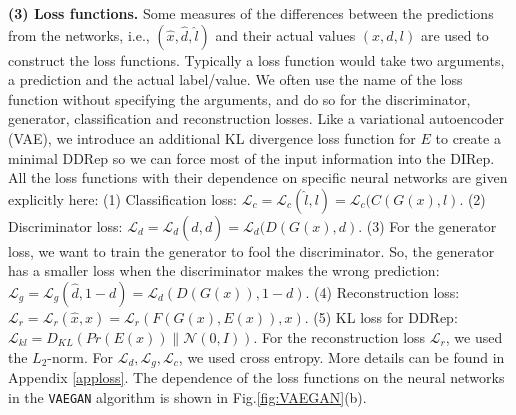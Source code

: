 \documentclass{article}
\newcommand\todo[1]{\textcolor{red}{#1}}
\newcommand{\remove}[1]{}
\begin{document}

\remove{\todo{I changed the following equations a bit. Please check for correctness, in particular the generator loss. I also added a bit of text and changed the order. BTW removing this todo shortens the length more than one might think}}
{\bf (3) Loss functions.} Some measures of the differences between the predictions from the networks, i.e., $(\hat{x},\hat{d},\hat{l})$ and their actual values $(x,d,l)$ are used to construct the loss functions. Typically a loss function would take two arguments, a prediction and the actual label/value. We often use the name of the loss function without specifying the arguments, and do so for the discriminator, generator, classification and reconstruction losses. Like a variational autoencoder (VAE), we introduce an additional KL divergence loss function for $E$ to create a minimal DDRep so we can force most of the input information into the DIRep. All the loss functions with their dependence on specific neural networks are given explicitly here: (1) Classification loss: $\mathcal{L}_c=\mathcal{L}_c(\hat{l},l)=\mathcal{L}_c(C(G(x),l)$. (2) Discriminator loss: $\mathcal{L}_d= \mathcal{L}_d (\hat{d},d)=\mathcal{L}_d(D(G(x),d)$. (3) For the generator loss, we want to train the generator to fool the discriminator. So, the generator has a smaller loss when the discriminator makes the wrong prediction: $\mathcal{L}_g=\mathcal{L}_g(\hat{d},1-d)=\mathcal{L}_d(D(G(x)),1-d) $.
(4) Reconstruction loss: 
$\mathcal{L}_r=\mathcal{L}_r(\hat{x},x)=\mathcal{L}_r(F(G(x),E(x)),x)$. (5) KL loss for DDRep:
$\mathcal{L}_{kl} =D_{KL}(Pr(E(x))\parallel\mathcal{N}(0,I))$.
For the reconstruction loss  $\mathcal{L}_r$, we used the $L_2$-norm. For  $\mathcal{L}_d,\mathcal{L}_g,\mathcal{L}_c$, we used cross entropy. More details can be found in Appendix \ref{apploss}.\remove{\todo{mw The more details are now in supplement, so the above reference doesn't work. also see if you like the way i defined
$\mathcal{L}_d(\hat{d},d)$ etc.}}
The dependence of the loss functions on the neural networks in the \verb"VAEGAN" algorithm is shown in Fig.\ref{fig:VAEGAN}(b). 
\end{document}
